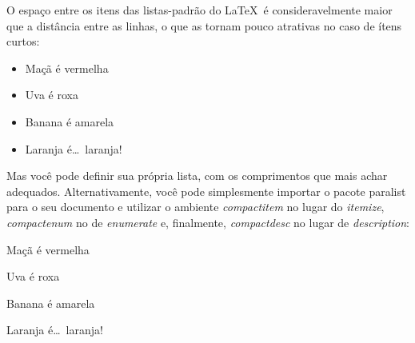 \documentclass[a4paper,12pt]{article}
\newcommand{\pacote}[1]{\textcolor{blue!60!white}{#1}}
\newcommand{\ambiente}[1]{\textsl{#1}}
\begin{document}
	O espaço entre os itens das listas-padrão do \LaTeX\ é consideravelmente
	maior que a distância entre as linhas, o que as tornam pouco atrativas no
	caso de ítens curtos:

	\begin{itemize}
		\item Maçã é vermelha
		\item Uva é roxa
		\item Banana é amarela
		\item Laranja é\dots\ laranja!
	\end{itemize}
	
	Mas você pode definir sua própria lista, com os comprimentos que mais achar
	adequados. Alternativamente, você pode simplesmente importar o pacote \pacote
	{paralist} para o seu documento e utilizar o ambiente \ambiente{compactitem}
	no lugar do \ambiente{itemize}, \ambiente{compactenum} no de
	\ambiente{enumerate} e, finalmente, \ambiente{compactdesc} no lugar de
	\ambiente{description}:

	\begin{compactitem}
		\item Maçã é vermelha
		\item Uva é roxa
		\item Banana é amarela
		\item Laranja é\dots\ laranja!
	\end{compactitem}
	
\end{document}
